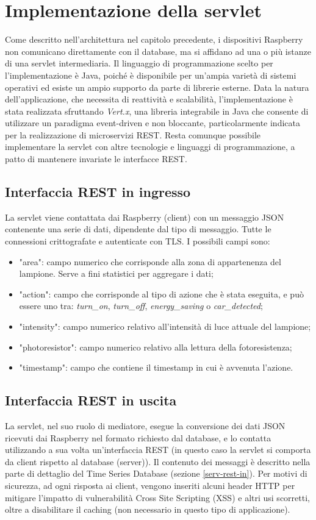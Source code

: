 \section{Implementazione della servlet \label{serv-impl}}
Come descritto nell'architettura nel capitolo precedente, i dispositivi Raspberry non comunicano direttamente con il database, ma si affidano ad una o più istanze di una servlet intermediaria.
Il linguaggio di programmazione scelto per l'implementazione è Java, poiché è disponibile per un'ampia varietà di sistemi operativi ed esiste un ampio supporto da parte di librerie esterne.
Data la natura dell'applicazione, che necessita di reattività e scalabilità, l'implementazione è stata realizzata sfruttando \textit{Vert.x}, una libreria integrabile in Java che consente di utilizzare un paradigma event-driven e non bloccante, particolarmente indicata per la realizzazione di microservizi REST.
Resta comunque possibile implementare la servlet con altre tecnologie e linguaggi di programmazione, a patto di mantenere invariate le interfacce REST.

\subsection{Interfaccia REST in ingresso \label{serv-rest-in}}
La servlet viene contattata dai Raspberry (client) con un messaggio JSON contenente una serie di dati, dipendente dal tipo di messaggio. Tutte le connessioni crittografate e autenticate con TLS.
I possibili campi sono:
\begin{itemize}
 \item "area": campo numerico che corrisponde alla zona di appartenenza del lampione. Serve a fini statistici per aggregare i dati;
 \item "action": campo che corrisponde al tipo di azione che è stata eseguita, e può essere uno tra: \textit{turn\_on}, \textit{turn\_off}, \textit{energy\_saving} o \textit{car\_detected};
 \item "intensity": campo numerico relativo all'intensità di luce attuale del lampione;
 \item "photoresistor": campo numerico relativo alla lettura della fotoresistenza;
 \item "timestamp": campo che contiene il timestamp in cui è avvenuta l'azione.
\end{itemize}

\subsection{Interfaccia REST in uscita}
La servlet, nel suo ruolo di mediatore, esegue la conversione dei dati JSON ricevuti dai Raspberry nel formato richiesto dal database, e lo contatta utilizzando a sua volta un'interfaccia REST (in questo caso la servlet si comporta da client rispetto al database (server)).
Il contenuto dei messaggi è descritto nella parte di dettaglio del Time Series Database (sezione \ref{serv-rest-in}).
Per motivi di sicurezza, ad ogni risposta ai client, vengono inseriti alcuni header HTTP per mitigare l'impatto di vulnerabilità Cross Site Scripting (XSS) e altri usi scorretti, oltre a disabilitare il caching (non necessario in questo tipo di applicazione).

